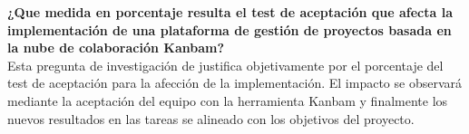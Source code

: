 







 \textbf{ ¿Que medida en porcentaje resulta el test de aceptación que  afecta la implementación de una plataforma de gestión de proyectos basada en la nube de colaboración Kanbam?} \\

Esta pregunta de investigación de justifica objetivamente por el  porcentaje del test de aceptación para la afección de la implementación. El impacto se observará mediante la aceptación del equipo con la herramienta Kanbam y finalmente los nuevos resultados en las tareas  se alineado con los objetivos del proyecto.


 